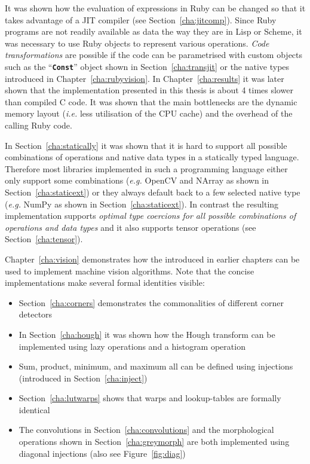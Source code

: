 \documentclass[12pt,a4paper,oneside,openright]{book}
\newcommand{\eg}{\emph{e.g.} }
\newcommand{\ie}{\emph{i.e.} }
\newcommand{\cha}[1]{Chapter~\ref{cha:#1}}
\newcommand{\sct}[1]{Section~\ref{cha:#1}}
\newcommand{\fig}[1]{Figure~\ref{fig:#1}}
\newcommand{\removed}[1]{\cbstart\removedfragile{#1}\cbend{}}
\newcommand{\removedfragile}[1]{{\color{red}{\sout{#1}}}{}}
\newcommand{\added}[1]{\cbstart\addedfragile{#1}\cbend{}}
\newcommand{\addedfragile}[1]{{\color{green!50!black}{\uline{#1}}}{}}
\newcommand{\removed}[1]{}
\newcommand{\removedfragile}[1]{}
\newcommand{\added}[1]{#1}
\newcommand{\addedfragile}[1]{#1}
\newcommand{\changed}[2]{\removed{#1}\added{#2}}
\newcommand{\code}[1]{``\texttt{\textbf{\textcolor{codegray}{\small{#1}}}}''}
\begin{document}
\begin{CJK}{UTF8}{}
It was shown how the evaluation of expressions in Ruby can be changed so that it takes advantage of a \ac{JIT} compiler (see \sct{jitcomp}). Since Ruby programs are not readily available as data the way they are in Lisp or Scheme, it was necessary to use Ruby objects to represent various operations. \emph{Code transformations} are possible if the code can be parametrised with custom objects such as the \code{Const} object shown in \sct{transjit} or the native types introduced in \cha{rubyvision}. In \cha{results} it was later shown that the implementation presented in this thesis is about 4 times slower than compiled C code. It was shown that the main bottlenecks are the dynamic memory layout (\ie less utilisation of the CPU cache) and the overhead of the calling Ruby code.

In \sct{statically} it was shown that it is hard to support all possible combinations of operations and native data types in a statically typed language. Therefore most libraries implemented in such a programming language either only support some combinations (\eg OpenCV and NArray as shown in \sct{staticext}) or they always default back to a few selected native type (\eg NumPy as shown in \sct{staticext}). In contrast the resulting implementation supports \emph{optimal type coercions for all possible combinations of operations and data types} and it also supports tensor operations (see \sct{tensor}).

\cha{vision} demonstrates how the \changed{DSL}{library} introduced in earlier chapters can be used to implement machine vision algorithms. Note that the concise implementations make several formal identities visible: 
\begin{itemize}
\item \sct{corners} demonstrates the commonalities of different corner detectors
\item In \sct{hough} it was shown how the Hough transform can be implemented using lazy operations and a histogram operation
\item Sum, product, minimum, and maximum all can be defined using injections (introduced in \sct{inject})
\item \sct{lutwarps} shows that warps and lookup-tables are formally identical
\item The convolutions in \sct{convolutions} and the morphological operations shown in \sct{greymorph} are both implemented using diagonal injections (also see \fig{diag})
\end{itemize}


\end{CJK}
\end{document}
